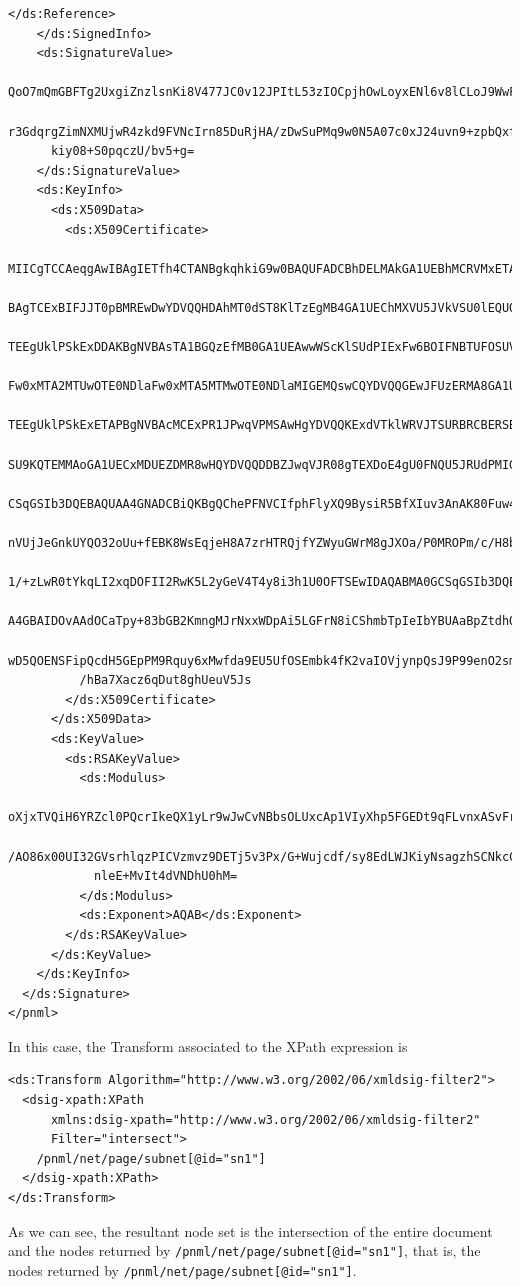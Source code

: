 \begin{lstlisting}[basicstyle=\ttfamily\tiny]
      </ds:Reference>
    </ds:SignedInfo>
    <ds:SignatureValue>
      QoO7mQmGBFTg2UxgiZnzlsnKi8V477JC0v12JPItL53zIOCpjhOwLoyxENl6v8lCLoJ9WwFHlBKk
      r3GdqrgZimNXMUjwR4zkd9FVNcIrn85DuRjHA/zDwSuPMq9w0N5A07c0xJ24uvn9+zpbQxfblYTb
      kiy08+S0pqczU/bv5+g=
    </ds:SignatureValue>
    <ds:KeyInfo>
      <ds:X509Data>
        <ds:X509Certificate>
          MIICgTCCAeqgAwIBAgIETfh4CTANBgkqhkiG9w0BAQUFADCBhDELMAkGA1UEBhMCRVMxETAPBgNV
          BAgTCExBIFJJT0pBMREwDwYDVQQHDAhMT0dST8KlTzEgMB4GA1UEChMXVU5JVkVSU0lEQUQgREUg
          TEEgUklPSkExDDAKBgNVBAsTA1BGQzEfMB0GA1UEAwwWScKlSUdPIExFw6BOIFNBTUFOSUVHTzAe
          Fw0xMTA2MTUwOTE0NDlaFw0xMTA5MTMwOTE0NDlaMIGEMQswCQYDVQQGEwJFUzERMA8GA1UECBMI
          TEEgUklPSkExETAPBgNVBAcMCExPR1JPwqVPMSAwHgYDVQQKExdVTklWRVJTSURBRCBERSBMQSBS
          SU9KQTEMMAoGA1UECxMDUEZDMR8wHQYDVQQDDBZJwqVJR08gTEXDoE4gU0FNQU5JRUdPMIGfMA0G
          CSqGSIb3DQEBAQUAA4GNADCBiQKBgQChePFNVCIfphFlyXQ9BysiR5BfXIuv3AnAK80Fuw4tTFwC
          nVUjJeGnkUYQO32oUu+fEBK8WsEqjeH8A7zrHTRQjfYZWyuGWrM8gJXOa/P0MROPm/c/H8b5a6Nx
          1/+zLwR0tYkqLI2xqDOFII2RwK5L2yGeV4T4y8i3h1U0OFTSEwIDAQABMA0GCSqGSIb3DQEBBQUA
          A4GBAIDOvAAdOCaTpy+83bGB2KmngMJrNxxWDpAi5LGFrN8iCShmbTpIeIbYBUAaBpZtdhOnhq4n
          wD5QOENSFipQcdH5GEpPM9Rquy6xMwfda9EU5UfOSEmbk4fK2vaIOVjynpQsJ9P99enO2smQlyvw
          /hBa7Xacz6qDut8ghUeuV5Js
        </ds:X509Certificate>
      </ds:X509Data>
      <ds:KeyValue>
        <ds:RSAKeyValue>
          <ds:Modulus>
            oXjxTVQiH6YRZcl0PQcrIkeQX1yLr9wJwCvNBbsOLUxcAp1VIyXhp5FGEDt9qFLvnxASvFrBKo3h
            /AO86x00UI32GVsrhlqzPICVzmvz9DETj5v3Px/G+Wujcdf/sy8EdLWJKiyNsagzhSCNkcCuS9sh
            nleE+MvIt4dVNDhU0hM=
          </ds:Modulus>
          <ds:Exponent>AQAB</ds:Exponent>
        </ds:RSAKeyValue>
      </ds:KeyValue>
    </ds:KeyInfo>
  </ds:Signature>
</pnml>
\end{lstlisting}

In this case, the Transform associated to the XPath expression is
\begin{lstlisting}
<ds:Transform Algorithm="http://www.w3.org/2002/06/xmldsig-filter2">
  <dsig-xpath:XPath
      xmlns:dsig-xpath="http://www.w3.org/2002/06/xmldsig-filter2"
      Filter="intersect">
    /pnml/net/page/subnet[@id="sn1"]
  </dsig-xpath:XPath>
</ds:Transform>
\end{lstlisting}

As we can see, the resultant node set is the intersection of the entire document
and the nodes returned by \texttt{/pnml/net/page/subnet[@id="sn1"]}, that
is, the nodes returned by \texttt{/pnml/net/page/subnet[@id="sn1"]}. 



